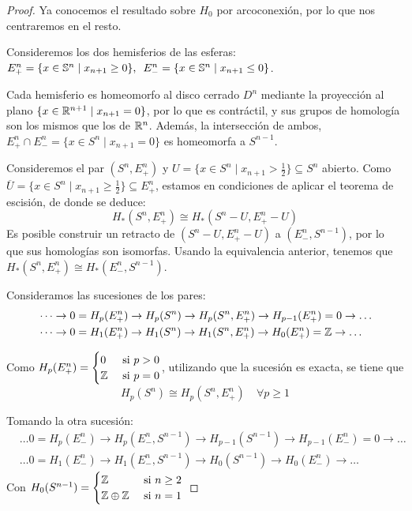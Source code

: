 \begin{proof}
  Ya conocemos el resultado sobre $H_0$ por arcoconexión, por lo que nos centraremos en el resto.

  Consideremos los dos hemisferios de las esferas: \\
  $E_+^n = \{x \in \S^n \mid x_{n+1} \geq 0\}, \hspace{0.5em} E_-^n = \{x \in \S^n \mid x_{n+1} \leq 0\}$.

  Cada hemisferio es homeomorfo al disco cerrado $D^n$ mediante la proyección al plano $\{x \in \R^{n+1} \mid x_{n+1} = 0\}$,
  por lo que es contráctil, y sus grupos de homología son los mismos que los de $\R^n$. Además, la intersección de
  ambos, $E_+^n \cap E_-^n = \{x \in S^n \mid x_{n+1} = 0\}$ es homeomorfa a $S^{n-1}$.

  Consideremos el par $(S^n, E_+^n)$ y $U = \{x \in S^n \mid x_{n+1} > \frac{1}{2}\} \subseteq S^n$ abierto. Como
  $\overline{U} = \{x \in S^n \mid x_{n+1} \geq \frac{1}{2}\} \subseteq E_+^n$, estamos en condiciones de aplicar
  el teorema de escisión, de donde se deduce:
  \[ H_*(S^n, E_+^n) \cong H_*(S^n - U, E_+^n - U) \]
  Es posible construir un retracto de $(S^n - U, E_+^n - U)$ a $(E_-^n, S^{n-1})$, por lo que sus
  homologías son isomorfas. Usando la equivalencia anterior, tenemos que $H_*(S^n, E_+^n) \cong H_*(E_-^n, S^{n-1})$.

  Consideramos las sucesiones de los pares:
  \begin{align*}
    &\dots \to 0 = H_p(E_+^n) \to H_p(S^n) \to H_p(S^n, E_+^n) \to H_{p-1}(E_+^n) = 0 \to \dots \\
    &\dots \to 0 = H_1(E_+^n) \to H_1(S^n) \to H_1(S^n, E_+^n) \to H_0(E_+^n) = \Z \to \dots
  \end{align*}

  Como $H_p(E_+^n) = \begin{cases} 0 &\text{ si } p > 0 \\ \Z &\text{ si } p = 0 \end{cases}$,
  utilizando que la sucesión es exacta, se tiene que
  \[H_p(S^n) \cong H_p(S^n, E_+^n) \quad \forall p \geq 1\]

  Tomando la otra sucesión:
  \begin{align*}
    &\dots 0 = H_p(E_-^n) \to H_p(E_-^n, S^{n-1}) \to H_{p-1}(S^{n-1}) \to H_{p-1}(E_-^n) = 0 \to \dots \\
    &\dots 0 = H_1(E_-^n) \to H_1(E_-^n, S^{n-1}) \to H_0(S^{n-1}) \to H_0(E_-^n) \to \dots
  \end{align*}
  Con $H_0(S^{n-1}) = \begin{cases} \Z &\text{ si } n \geq 2 \\ \Z \oplus \Z &\text{ si } n = 1 \end{cases}$


\end{proof}
